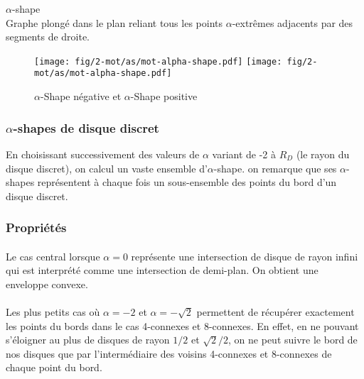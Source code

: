 \begin{Definition}{$\alpha$-shape}\\
\label{def:as}
      Graphe plongé dans le plan reliant tous les points $\alpha$-extrêmes adjacents par des segments de droite.
\end{Definition}

\begin{figure}[H]
  \centering
  \texttt{[image: fig/2-mot/as/mot-alpha-shape.pdf]}
  \texttt{[image: fig/2-mot/as/mot-alpha-shape.pdf]}
  \caption{$\alpha$-Shape négative et $\alpha$-Shape positive }
\end{figure}


\subsubsection{$\alpha$-shapes de disque discret}

En choisissant successivement des valeurs de $\alpha$ variant de -2 à $R_D$ (le rayon du disque discret), on calcul un vaste ensemble d'$\alpha$-shape. on remarque que ses $\alpha$-shapes représentent à chaque fois un sous-ensemble des points du bord d'un disque discret.


\subsubsection{Propriétés}

\paragraph{}
Le cas central lorsque $\alpha = 0$ représente une intersection de disque de rayon infini qui est interprété comme une intersection de demi-plan. On obtient une enveloppe convexe.

\paragraph{}
Les plus petits cas où $\alpha = -2$ et $\alpha = -\sqrt{2}$ permettent de récupérer exactement les points du bords dans le cas 4-connexes et 8-connexes. En effet, en ne pouvant s'éloigner au plus de disques de rayon $1/2$ et $\sqrt{2}/2$, on ne peut suivre le bord de nos disques que par l'intermédiaire des voisins 4-connexes et 8-connexes de chaque point du bord.

